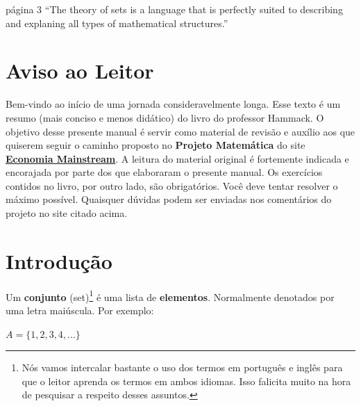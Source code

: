 \documentclass[main.tex]{subfiles}
\begin{document}
\begin{chapquote}{página 3}
	``The theory of sets is a language that is perfectly suited to describing and explaning all types of mathematical structures.''
\end{chapquote}

\section*{Aviso ao Leitor}
Bem-vindo ao início de uma jornada consideravelmente longa. Esse texto é um resumo (mais conciso e menos didático) do livro do professor Hammack. O objetivo desse presente manual é servir como material de revisão e auxílio aos que quiserem seguir o caminho proposto no \textbf{Projeto Matemática} do site \href{https://economiamainstream.com.br/artigo/matematica/}{\textbf{Economia Mainstream}}. A leitura do material original é fortemente indicada e encorajada por parte dos que elaboraram o presente manual. Os exercícios contidos no livro, por outro lado, são obrigatórios. Você deve tentar resolver o máximo possível. Quaisquer dúvidas podem ser enviadas nos comentários do projeto no site citado acima.

\section{Introdução}
Um \textbf{conjunto} (set)\footnote{Nós vamos intercalar bastante o uso dos termos em português e inglês para que o leitor aprenda os termos em ambos idiomas. Isso falicita muito na hora de pesquisar a respeito desses assuntos.} é uma lista de \textbf{elementos}. Normalmente denotados por uma letra maiúscula. Por exemplo:

\begin{center}
	$ A = \{1 , 2 , 3 , 4 , ... \} $
\end{center}
\end{document}
